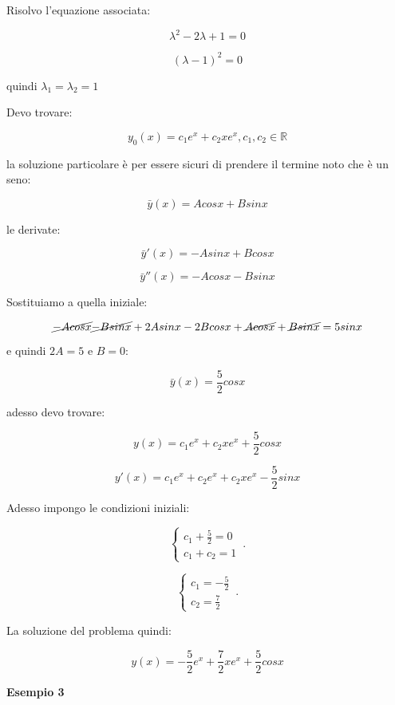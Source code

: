 \documentclass[11pt]{article}
\begin{document}
Risolvo l'equazione associata:

\[
    \lambda^{2}-2 \lambda + 1=0
\]

\[
    (\lambda-1)^{2}=0
\]

quindi $\lambda_1=\lambda_2=1$


Devo trovare:

\[
    y_0(x) = c_1 e ^{x} + c_2 x e ^{x},c_1,c_2 \in \mathbb{R}
\]

la soluzione particolare è per essere sicuri di prendere il termine noto che è un seno:

\[
    \bar{y} (x) = A cosx + B sinx
\]

le derivate:

\[
    \bar{y} '(x)  = -A sinx + B cosx
\]

\[
    \bar{y} ''(x)  = -A cosx - B sinx
\]
    

Sostituiamo a quella iniziale:

\[
    \cancel{-A cosx} \cancel{- Bsinx} + 2A sinx - 2B cosx+ \cancel{A cosx} + \cancel{Bsinx} = 5sinx
\]

e quindi $2A = 5$ e $B=0$:

\[
    \bar{y} (x) = \frac{5}{2} cosx
\]

adesso devo trovare:

\[
    y(x) = c_1 e ^{x}+ c_2 x e ^{x} + \frac{5}{2} cosx
\]

\[
    y'(x)  = c_1 e ^{x} + c_2 e ^{x} + c_2x e ^{x} - \frac{5}{2}sinx
\]

Adesso impongo le condizioni iniziali:

    \begin{equation}
        \begin{cases}
            c_1 +\frac{5}{2}=0\\
            c_1+c_2= 1
        \end{cases}\,.
    \end{equation}

    \begin{equation}
        \begin{cases}
            c_1 = -\frac{5}{2}\\
            c_2 = \frac{7}{2}
        \end{cases}\,.
    \end{equation}

La soluzione del problema quindi:

\[
    y(x) = -\frac{5}{2}e ^{x}+ \frac{7}{2} x e ^{x} + \frac{5}{2} cosx
\]

\textbf{Esempio 3} 
\end{document}
